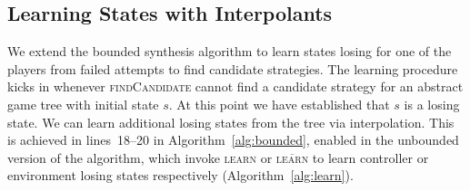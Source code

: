 \documentclass{llncs}
\newcommand{\textoverline}[1]{$\overline{\mbox{#1}}$}
\begin{document}

\subsection{Learning States with Interpolants}

We extend the bounded synthesis algorithm to learn states losing for one of the players from
failed attempts to find candidate strategies.  The learning procedure kicks in whenever
\textsc{findCandidate} cannot find a candidate strategy for an abstract game tree with initial
state $s$.  At this point we have established that $s$ is a losing state.  We can learn additional losing
states from the tree via interpolation.  This is achieved in lines~18--20 in Algorithm~\ref{alg:bounded},
enabled in the unbounded version of the algorithm, which invoke \textsc{learn} or
\textsc{\textoverline{learn}} to learn controller or environment losing states respectively
(Algorithm~\ref{alg:learn}).
\end{document}

